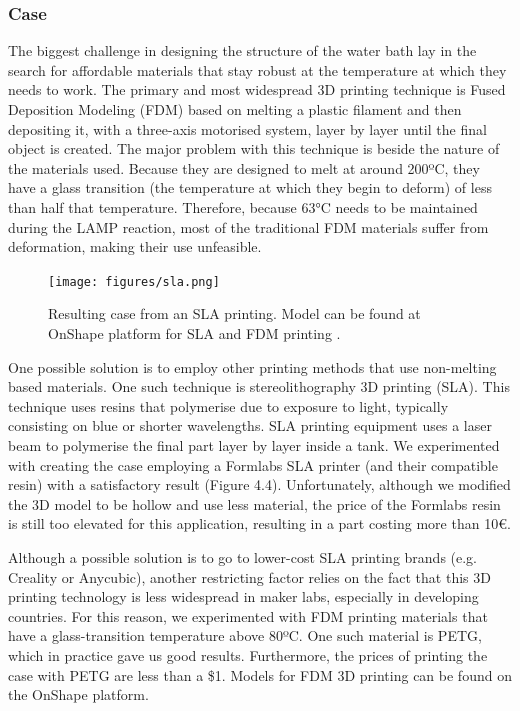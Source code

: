\subsubsection{Case}
The biggest challenge in designing the structure of the water bath lay in the search for affordable materials that stay robust at the temperature at which they needs to work. The primary and most widespread 3D printing technique is Fused Deposition Modeling (FDM) based on melting a plastic filament and then depositing it, with a three-axis motorised system, layer by layer until the final object is created. The major problem with this technique is beside the nature of the materials used. Because they are designed to melt at around 200ºC, they have a glass transition (the temperature at which they begin to deform) of less than half that temperature. Therefore, because 63°C needs to be maintained during the LAMP reaction, most of the traditional FDM materials suffer from deformation, making their use unfeasible.

\begin{figure}[b]
    \centering
    \texttt{[image: figures/sla.png]}
    \caption{Resulting case from an SLA printing. Model can be found at OnShape platform for SLA\cite{francisco_javier_quero_lombardero_sla_2021} and FDM printing \cite{francisco_javier_quero_lombardero_fdm_2021}.}
    \label{3D printing}
\end{figure}

One possible solution is to employ other printing methods that use non-melting based materials. One such technique is stereolithography 3D printing (SLA). This technique uses resins that polymerise due to exposure to light, typically consisting on blue or shorter wavelengths. SLA printing equipment uses a laser beam to polymerise the final part layer by layer inside a tank. We experimented with creating the case employing a Formlabs SLA printer (and their compatible resin) with a satisfactory result (Figure 4.4). Unfortunately, although we modified the 3D model to be hollow and use less material\cite{francisco_javier_quero_lombardero_sla_2021}, the price of the Formlabs resin is still too elevated for this application, resulting in a part costing more than 10€.


Although a possible solution is to go to lower-cost SLA printing brands (e.g. Creality or Anycubic), another restricting factor relies on the fact that this 3D printing technology is less widespread in maker labs, especially in developing countries. For this reason, we experimented with FDM printing materials that have a glass-transition temperature above 80ºC. One such material is PETG, which in practice gave us good results. Furthermore, the prices of printing the case with PETG are less than a \$1. Models for FDM 3D printing can be found on the OnShape platform\cite{francisco_javier_quero_lombardero_fdm_2021}.


